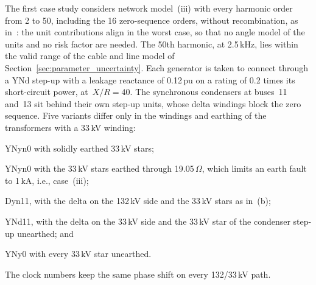 The first case study considers network model~(iii) with every harmonic order from 2 to 50, including the 16 zero-sequence orders, without recombination, as in~\cite{vanacker_hosting_2026}: the unit contributions align in the worst case, so that no angle model of the units and no risk factor are needed. The 50th harmonic, at 2.5\,kHz, lies within the valid range of the cable and line model of Section~\ref{sec:parameter_uncertainty}. Each generator is taken to connect through a YNd step-up with a leakage reactance of 0.12\,pu on a rating of 0.2 times its short-circuit power, at~$X/R = 40$. The synchronous condensers at buses~11 and~13 sit behind their own step-up units, whose delta windings block the zero sequence. %
Five variants differ only in the windings and earthing of the transformers with a 33\,kV winding:
\begin{enumerate*}
    \item[(a)] YNyn0 with solidly earthed 33\,kV stars;
    \item[(b)] YNyn0 with the 33\,kV stars earthed through 19.05\,$\Omega$, which limits an earth fault to 1\,kA, i.e., case~(iii);
    \item[(c)] Dyn11, with the delta on the 132\,kV side and the 33\,kV stars as in~(b);
    \item[(d)] YNd11, with the delta on the 33\,kV side and the 33\,kV star of the condenser step-up unearthed; and
    \item[(e)] YNy0 with every 33\,kV star unearthed.
\end{enumerate*}
The clock numbers keep the same phase shift on every 132/33\,kV path.

